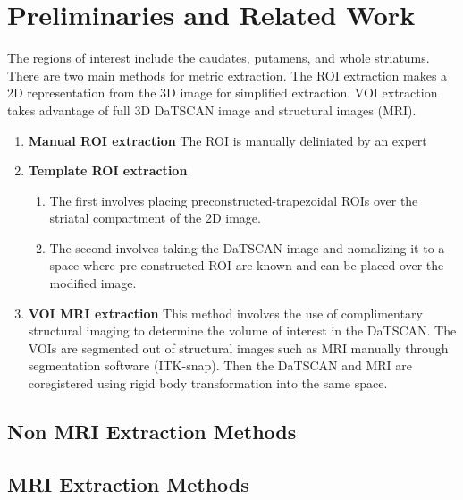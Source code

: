 \section{Preliminaries and Related Work}
The regions of interest include the caudates, putamens, and whole striatums. There are two main methods for metric extraction. The ROI extraction makes a 2D representation from the 3D image for simplified extraction. VOI extraction takes advantage of full 3D DaTSCAN image and structural images (MRI). 
\begin{enumerate}
    \item \textbf{Manual ROI extraction} The ROI is manually deliniated by an expert 
    \item \textbf{Template ROI extraction}
        \begin{enumerate}
            \item The first involves placing preconstructed-trapezoidal ROIs over the striatal compartment of the 2D image.
            \item The second involves taking the DaTSCAN image and nomalizing it to a space where pre constructed ROI are known and can be placed over the modified image.
        \end{enumerate}
    \item \textbf{VOI MRI extraction} This method involves the use of complimentary structural imaging to determine the volume of interest in the DaTSCAN. The VOIs are segmented out of structural images such as MRI manually through segmentation software (ITK-snap). Then the DaTSCAN and MRI are coregistered using rigid body transformation into the same space.
\end{enumerate}
\subsection{Non MRI Extraction Methods}
\subsection{MRI Extraction Methods}
